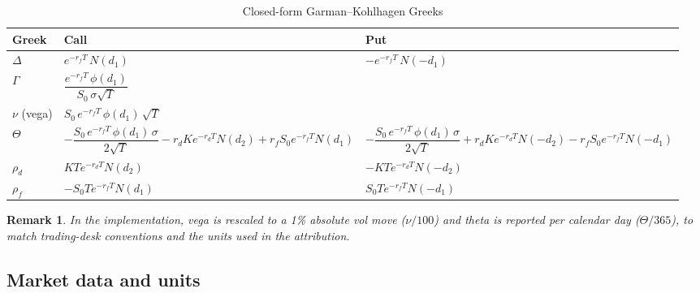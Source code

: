 \documentclass[11pt, a4paper]{article}
\theoremstyle{defstyle}
\newtheorem*{remark}{Remark}
\begin{document}
\begin{table}[H]
\centering
\renewcommand{\arraystretch}{1.6}
\begin{tabular}{@{} l l l @{}}
    \toprule
    \textbf{Greek}    & \textbf{Call}                                                       & \textbf{Put} \\
    \midrule
    $\Delta$          & $e^{-r_f T}\,N(d_1)$                                                 & $-e^{-r_f T}\,N(-d_1)$ \\
    $\Gamma$          & \multicolumn{2}{l}{$\dfrac{e^{-r_f T}\,\phi(d_1)}{S_0\,\sigma\sqrt{T}}$} \\
    $\nu$ (vega)      & \multicolumn{2}{l}{$S_0\,e^{-r_f T}\,\phi(d_1)\,\sqrt{T}$} \\
    $\Theta$          & $-\dfrac{S_0\,e^{-r_f T}\,\phi(d_1)\,\sigma}{2\sqrt{T}} - r_d K e^{-r_d T} N(d_2) + r_f S_0 e^{-r_f T} N(d_1)$
                      & $-\dfrac{S_0\,e^{-r_f T}\,\phi(d_1)\,\sigma}{2\sqrt{T}} + r_d K e^{-r_d T} N(-d_2) - r_f S_0 e^{-r_f T} N(-d_1)$ \\
    $\rho_d$          & $K T e^{-r_d T} N(d_2)$                                              & $-K T e^{-r_d T} N(-d_2)$ \\
    $\rho_f$          & $-S_0 T e^{-r_f T} N(d_1)$                                           & $S_0 T e^{-r_f T} N(-d_1)$ \\
    \bottomrule
\end{tabular}
\caption{Closed-form Garman--Kohlhagen Greeks}
\end{table}

\begin{remark}
In the implementation, vega is rescaled to a 1\% absolute vol move
($\nu/100$) and theta is reported per calendar day ($\Theta/365$), to match
trading-desk conventions and the units used in the attribution.
\end{remark}

\subsection{Market data and units}
\end{document}
